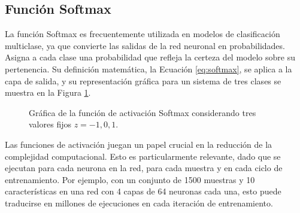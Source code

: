 
\subsection{Función Softmax}
La función Softmax es frecuentemente utilizada en modelos de clasificación multiclase, ya que convierte las salidas de la red neuronal en probabilidades. Asigna a cada clase una probabilidad que refleja la certeza del modelo sobre su pertenencia. Su definición matemática, la Ecuación \ref{eq:softmax}, se aplica a la capa de salida, y su representación gráfica para un sistema de tres clases se muestra en la Figura \ref{fig:softmax}.

\begin{figure}[H]
    \centering
    \caption{Gráfica de la función de activación Softmax considerando tres valores fijos \( z = -1, 0, 1 \).}
    \label{fig:softmax}
\end{figure}




Las funciones de activación juegan un papel crucial en la reducción de la complejidad computacional. Esto es particularmente relevante, dado que se ejecutan para cada neurona en la red, para cada muestra y en cada ciclo de entrenamiento. Por ejemplo, con un conjunto de 1500 muestras y 10 características en una red con 4 capas de 64 neuronas cada una, esto puede traducirse en millones de ejecuciones en cada iteración de entrenamiento.

